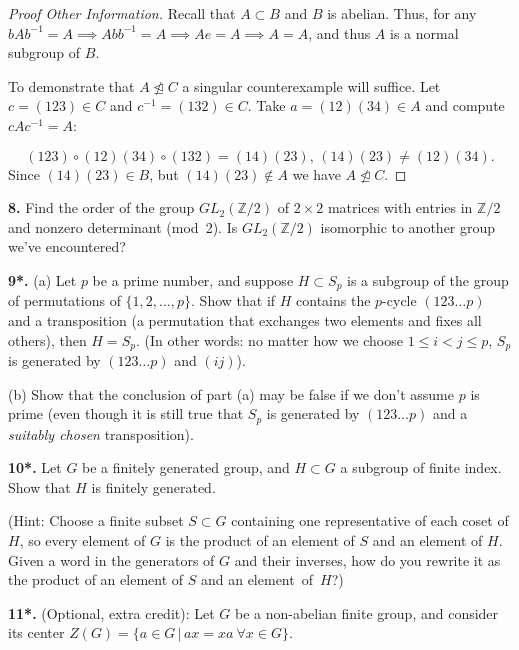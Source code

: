 \documentclass[11pt,letterpaper]{article}
\def\Z{\mathbb{Z}}
\begin{document}
\begin{proof}[Proof Other Information]
  Recall that \( A \subset B \) and \( B \) is abelian. Thus, for any \( bAb^{-1}=A \implies Abb^{-1}=A \implies Ae=A \implies A=A \), and thus \( A \) is a normal subgroup of \( B \). 

  To demonstrate that \( A \ntrianglelefteq C  \) a singular counterexample will suffice. Let \( c=(123)\in  C \) and \( c^{-1}=(132)\in  C \). Take \( a=(12)(34) \in  A \) and compute \( cAc^{-1}=A \):

  \[
    (123)\circ(12)(34)\circ(132)=(14)(23), \, (14)(23) \neq (12)(34)
  .\] 
  Since \( (14)(23)\in B\), but \((14)(23)\not\in A\) we have \( A \ntrianglelefteq C \).


\end{proof}





 

{\bf 8.} Find the order of the group $GL_2(\Z/2)$ of $2\times 2$ matrices
with entries in $\Z/2$ and nonzero determinant (mod~2).
Is $GL_2(\Z/2)$ isomorphic to another group we've encountered?
\medskip

 




\newpage

{\bf 9*.} (a) Let $p$ be a prime number, and suppose $H\subset S_p$ is a
subgroup of the group of permutations of $\{1,2,\dots,p\}$. Show that
if $H$ contains the $p$-cycle $(123\dots p)$ and a transposition (a
permutation that exchanges two elements and fixes all others), then
$H=S_p$. (In other words: no matter how we choose $1\leq i<j\leq p$,
$S_p$ is generated by $(123\dots p)$ and $(ij)$).

(b) Show that the conclusion of part (a) may be false if we don't assume $p$
is prime (even though it is still true that $S_p$ is generated by $(123\dots p)$ and 
a {\em suitably chosen} transposition).
\medskip

{\bf 10*.} Let $G$ be a finitely generated group, and $H\subset G$ a subgroup
of finite index. Show that $H$ is finitely generated.

(Hint: Choose a finite subset $S\subset G$ containing one representative
of each coset of $H$, so every element of $G$ is the
product of an element of $S$ and an element of $H$. Given a word in the generators of $G$ and their
inverses, how do you rewrite it as the product of an element of $S$ and an
element~of~$H$?)
\medskip

{\bf 11*.} (Optional, extra credit): Let $G$ be a non-abelian finite group,
and consider its center $Z(G)=\{a\in G\,|\,ax=xa\ \forall x\in G\}$.
\end{document}
